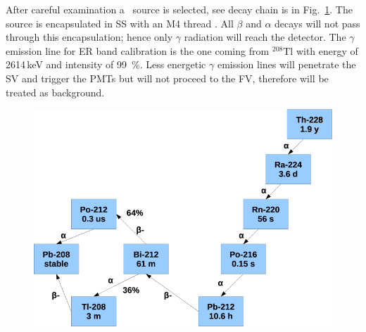 After careful examination a \Th\ source is selected, see decay chain is in Fig.~\ref{fig:th228}. The source is encapsulated in SS with an M4 thread . All $\beta$ and $\alpha$ decays will not pass through this encapsulation; hence  only $\gamma$ radiation will reach the detector. The $\gamma$ emission line for ER band calibration is the one coming from $^{208}\mathrm{Tl}$ with energy of 2614\,keV and intensity of 99~\%. Less energetic $\gamma$ emission lines will penetrate the SV and trigger the PMTs but will not proceed to the FV, therefore will be treated as background. 

\begin{figure}
	\begin{center}
	\includegraphics[height= 0.5\textheight]{figs/Th228Check.PNG}%
		\label{fig:th228}		
		\end{center}
	
	\end{figure} 
 
